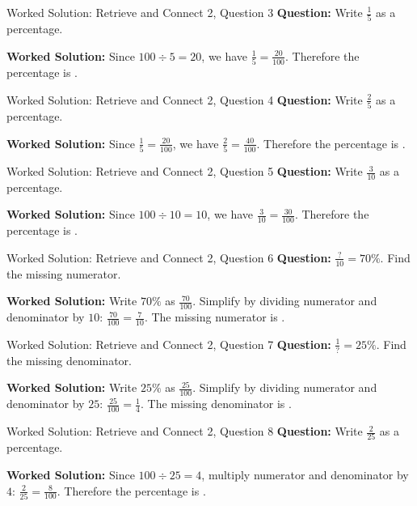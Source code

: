 \documentclass{beamer}
\newcommand{\ablank}[1]{%
  \alt<2>{\textcolor{red}{#1}}{\underline{\phantom{#1}}}%
}
\begin{document}
\begin{frame}[t]{Worked Solution: Retrieve and Connect 2, Question 3}
\textbf{Question:} Write \(\frac{1}{5}\) as a percentage.

\smallskip
\textbf{Worked Solution:} Since \(100 \div 5 = 20\), we have \(\frac{1}{5} = \frac{20}{100}\). Therefore the percentage is \ablank{$20\%$}.
\end{frame}

\begin{frame}[t]{Worked Solution: Retrieve and Connect 2, Question 4}
\textbf{Question:} Write \(\frac{2}{5}\) as a percentage.

\smallskip
\textbf{Worked Solution:} Since \(\frac{1}{5} = \frac{20}{100}\), we have \(\frac{2}{5} = \frac{40}{100}\). Therefore the percentage is \ablank{$40\%$}.
\end{frame}

\begin{frame}[t]{Worked Solution: Retrieve and Connect 2, Question 5}
\textbf{Question:} Write \(\frac{3}{10}\) as a percentage.

\smallskip
\textbf{Worked Solution:} Since \(100 \div 10 = 10\), we have \(\frac{3}{10} = \frac{30}{100}\). Therefore the percentage is \ablank{$30\%$}.
\end{frame}

\begin{frame}[t]{Worked Solution: Retrieve and Connect 2, Question 6}
\textbf{Question:} \(\frac{?}{10} = 70\%\). Find the missing numerator.

\smallskip
\textbf{Worked Solution:} Write \(70\%\) as \(\frac{70}{100}\). Simplify by dividing numerator and denominator by \(10\): \(\frac{70}{100} = \frac{7}{10}\). The missing numerator is \ablank{$7$}.
\end{frame}

\begin{frame}[t]{Worked Solution: Retrieve and Connect 2, Question 7}
\textbf{Question:} \(\frac{1}{?} = 25\%\). Find the missing denominator.

\smallskip
\textbf{Worked Solution:} Write \(25\%\) as \(\frac{25}{100}\). Simplify by dividing numerator and denominator by \(25\): \(\frac{25}{100} = \frac{1}{4}\). The missing denominator is \ablank{$4$}.
\end{frame}

\begin{frame}[t]{Worked Solution: Retrieve and Connect 2, Question 8}
\textbf{Question:} Write \(\frac{2}{25}\) as a percentage.

\smallskip
\textbf{Worked Solution:} Since \(100 \div 25 = 4\), multiply numerator and denominator by \(4\): \(\frac{2}{25} = \frac{8}{100}\). Therefore the percentage is \ablank{$8\%$}.
\end{frame}
\end{document}
